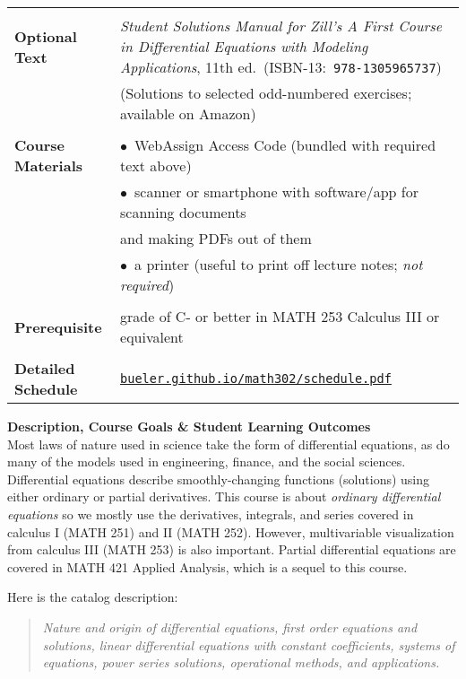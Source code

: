 \documentclass[12pt]{article}
\renewcommand{\emph}[1]{\textsf{\textbf{#1}}}
\newcommand{\localhead}[1]{\par\smallskip\textbf{#1}\nobreak\\}%
\def\heading#1{\localhead{\large\emph{#1}}}
\begin{document}
\begin{tabularx}{\textwidth}{lX}
 & \\
\emph{Optional Text}     & \textit{Student Solutions Manual for Zill's A First Course in Differential Equations with Modeling Applications}, 11th ed.~(ISBN-13:\, \texttt{978-1305965737}) \\
    & (Solutions to selected odd-numbered exercises; available on Amazon) \\
 & \\
\emph{Course Materials}  & $\bullet$\, WebAssign Access Code (bundled with required text above) \\
                         & $\bullet$\, scanner or smartphone with software/app for scanning documents \\
                         & \quad and making PDFs out of them \\
                         & $\bullet$\, a printer (useful to print off lecture notes; \textsl{not required}) \\
 & \\
\emph{Prerequisite}      & grade of C- or better in MATH 253 Calculus III or equivalent \\
 & \\
\emph{Detailed Schedule} & \href{https://bueler.github.io/math302/schedule.pdf}{\tt bueler.github.io/math302/schedule.pdf}
\end{tabularx}

\vfill

\newpage
\cfoot{\thepage}
\strut \medskip

\heading{Description, Course Goals \& Student Learning Outcomes}
Most laws of nature used in science take the form of differential equations, as do many of the models used in engineering, finance, and the social sciences.  Differential equations describe smoothly-changing functions (solutions) using either ordinary or partial derivatives.  This course is about \textsl{ordinary differential equations} so we mostly use the derivatives, integrals, and series covered in calculus I (MATH 251) and II (MATH 252).  However, multivariable visualization from calculus III (MATH 253) is also important.  Partial differential equations are covered in MATH 421 Applied Analysis, which is a sequel to this course.

Here is the catalog description:
\begin{quote}
\textsl{Nature and origin of differential equations, first order equations and solutions, linear differential equations with constant coefficients, systems of equations, power series solutions, operational methods, and applications.}
\end{quote}
\end{document}
